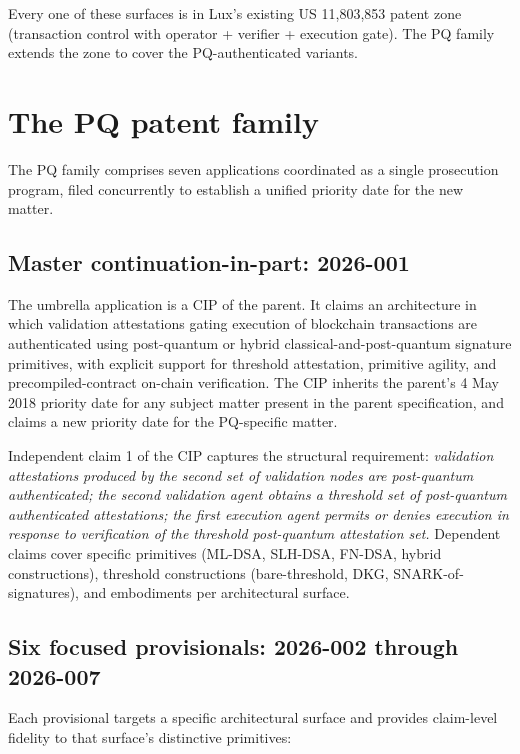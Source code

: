 \documentclass[11pt,letterpaper]{article}
\begin{document}
Every one of these surfaces is in Lux's existing US 11,803,853 patent zone (transaction control with operator + verifier + execution gate). The PQ family extends the zone to cover the PQ-authenticated variants.

\section{The PQ patent family}

The PQ family comprises seven applications coordinated as a single prosecution program, filed concurrently to establish a unified priority date for the new matter.

\subsection{Master continuation-in-part: 2026-001}

The umbrella application is a CIP of the parent. It claims an architecture in which validation attestations gating execution of blockchain transactions are authenticated using post-quantum or hybrid classical-and-post-quantum signature primitives, with explicit support for threshold attestation, primitive agility, and precompiled-contract on-chain verification. The CIP inherits the parent's 4 May 2018 priority date for any subject matter present in the parent specification, and claims a new priority date for the PQ-specific matter.

Independent claim 1 of the CIP captures the structural requirement: \emph{validation attestations produced by the second set of validation nodes are post-quantum authenticated; the second validation agent obtains a threshold set of post-quantum authenticated attestations; the first execution agent permits or denies execution in response to verification of the threshold post-quantum attestation set.} Dependent claims cover specific primitives (ML-DSA, SLH-DSA, FN-DSA, hybrid constructions), threshold constructions (bare-threshold, DKG, SNARK-of-signatures), and embodiments per architectural surface.

\subsection{Six focused provisionals: 2026-002 through 2026-007}

Each provisional targets a specific architectural surface and provides claim-level fidelity to that surface's distinctive primitives:
\end{document}
